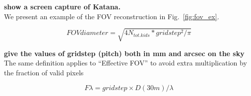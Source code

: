 {\bf show a screen capture of Katana.}\\

We present an example of the FOV reconstruction in Fig.~\ref{fig:fov_ex}.

\begin{equation}
FOV diameter = \sqrt{4 N_{tot. kids} * gridstep^2/\pi}
\end{equation}

{\bf give the values of gridstep (pitch) both in mm and arcsec on the sky}\\

The same definition applies to ``Effective FOV'' to avoid extra multiplication
by the fraction of valid pixels

\begin{equation}
F\lambda = gridstep\times D(30m)/\lambda
\end{equation}
